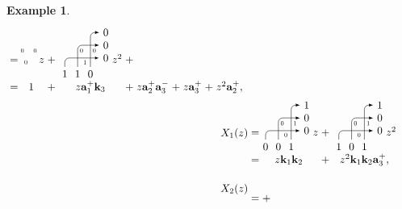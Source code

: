 \documentclass[11pt]{article}
\theoremstyle{definition}
\newtheorem{exam}[theo]{Example}
\numberwithin{equation}{section}
\newcommand{\aaa}{\mathbf{a}}
\newcommand{\kk}{\mathbf{k}}
\begin{document}
\begin{exam}
\begin{align*}
\begin{array}{@{\;=}c@{\;+\;}c@{\;+\;}c@{\;+\;}c@{\;+\;}c}
\begin{tikzpicture}[scale=.42,>=latex,rounded corners,baseline=-1cm,rotate=-90]
\draw (1.42,0) node[anchor=west,scale=.6] {$0$};
\draw (1.42,-1) node[anchor=west,scale=.6] {$0$};
\draw (2,-.42) node[anchor=north,scale=.6] {$0$};
\end{tikzpicture}
z
&
\begin{tikzpicture}[scale=.42,>=latex,rounded corners,baseline=-1cm,rotate=-90]
\draw[->] (2.7,0) node[anchor=north] {$0$} -- (0,0) -- (0,0.7) node[anchor=west] {$0$};
\draw[->] (2.7,-1) node[anchor=north] {$1$} -- (1,-1) -- (1,0.7) node[anchor=west] {$0$};
\draw[->] (2.7,-2) node[anchor=north] {$1$} -- (2,-2) -- (2,0.7) node[anchor=west] {$0$};
\draw (1.42,0) node[anchor=west,scale=.6] {$0$};
\draw (1.42,-1) node[anchor=west,scale=.6] {$0$};
\draw (2,-.42) node[anchor=north,scale=.6] {$1$};
\end{tikzpicture}
z^2
\\
1 & z \aaa_1^+ \kk_3 & z \aaa_2^+ \aaa_3^- & z \aaa_3^+ & z^2 \aaa_2^+,
\end{array}
%
\allowdisplaybreaks \\
%
\raisebox{-1pt}{$X_1(z)$} & \begin{array}{@{\;=}c@{\;+\;}c}  \begin{tikzpicture}[scale=.42,>=latex,rounded corners,baseline=-1cm,rotate=-90]
\draw[->] (2.7,0) node[anchor=north] {$1$} -- (0,0) -- (0,0.7) node[anchor=west] {$1$};
\draw[->] (2.7,-1) node[anchor=north] {$0$} -- (1,-1) -- (1,0.7) node[anchor=west] {$0$};
\draw[->] (2.7,-2) node[anchor=north] {$0$} -- (2,-2) -- (2,0.7) node[anchor=west] {$0$};
\draw (1.42,0) node[anchor=west,scale=.6] {$1$};
\draw (1.42,-1) node[anchor=west,scale=.6] {$0$};
\draw (2,-.42) node[anchor=north,scale=.6] {$0$};
\end{tikzpicture}
z
&
\begin{tikzpicture}[scale=.42,>=latex,rounded corners,baseline=-1cm,rotate=-90]
\draw[->] (2.7,0) node[anchor=north] {$1$} -- (0,0) -- (0,0.7) node[anchor=west] {$1$};
\draw[->] (2.7,-1) node[anchor=north] {$0$} -- (1,-1) -- (1,0.7) node[anchor=west] {$0$};
\draw[->] (2.7,-2) node[anchor=north] {$1$} -- (2,-2) -- (2,0.7) node[anchor=west] {$0$};
\draw (1.42,0) node[anchor=west,scale=.6] {$1$};
\draw (1.42,-1) node[anchor=west,scale=.6] {$0$};
\draw (2,-.42) node[anchor=north,scale=.6] {$0$};
\end{tikzpicture}
z^2
\\
z \kk_1 \kk_2 & z^2 \kk_1 \kk_2 \aaa_3^+,
\end{array}
%
\allowdisplaybreaks \\
%
\raisebox{-1pt}{$X_2(z)$} & \begin{array}{@{\;=}c@{\;+\;}c@{\;+\;}c} \begin{tikzpicture}[scale=.42,>=latex,rounded corners,baseline=-1cm,rotate=-90]

\end{tikzpicture}
\end{array}
\end{align*}
\end{exam}
\end{document}
